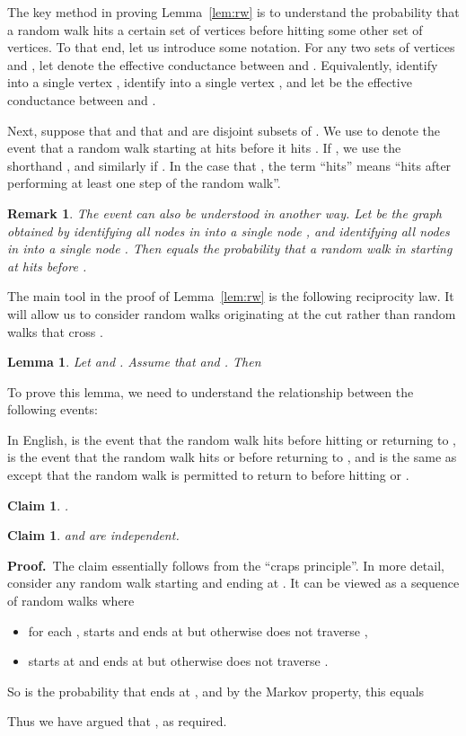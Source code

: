 \documentclass[11pt]{article}
\newcommand{\proofbelow}{8pt}
\numberwithin{equation}{section}
\newtheorem{lemma}[theorem]{Lemma}
\newtheorem*{remark}{Remark}
\newtheorem{claim}[theorem]{Claim}
\renewenvironment{proof}{\noindent\textbf{Proof.}\,}{\afterproof}
\newcommand{\afterproof}{\hfill  \par \vspace{\proofbelow}}
\newcommand{\ClaimName}[1]{\label{clm:#1}}
\newcommand{\LemmaName}[1]{\label{lem:#1}}
\newcommand{\Lemma}[1]{Lemma~\ref{lem:#1}}
\begin{document}
The key method in proving \Lemma{rw} is to understand the probability
that a random walk hits a certain set of vertices before hitting some other set of vertices.
To that end, let us introduce some notation.
For any two sets of vertices  and , 
let  denote the effective conductance between  and .
Equivalently, identify  into a single vertex , identify  into a single vertex ,
and let  be the effective conductance between  and .

Next, suppose that  and that  and  are disjoint subsets of .
We use  to denote the event that 
a random walk starting at  hits  before it hits .
If , we use the shorthand ,
and similarly if .
In the case that , the term ``hits'' means
``hits after performing at least one step of the random walk''.

\begin{remark}
The event  can also be understood in another way.
Let  be the graph obtained by identifying all nodes in  into a single node ,
and identifying all nodes in  into a single node .
Then  equals the probability that a random walk in 
starting at  hits  before .
\end{remark}

The main tool in the proof of \Lemma{rw} is the following reciprocity law.
It will allow us to consider random walks originating at the cut  rather
than random walks that cross .

\begin{lemma}
\LemmaName{switch}
Let  and .
Assume that  and .
Then

\end{lemma}

To prove this lemma, we need to understand the relationship between the following events:

In English,  is the event
that the random walk hits  before hitting  or returning to ,
 is the event that the random walk hits  or  before returning to ,
and  is the same as  except that
the random walk is permitted to return to  before hitting  or .

\begin{claim}
\ClaimName{split_xi}
.
\end{claim}

\begin{claim}
\ClaimName{indep_xi}
 and  are independent.
\end{claim}
\begin{proof}
The claim essentially follows from the ``craps principle''.
In more detail, consider any random walk starting  and ending at .
It can be viewed as a sequence  of random walks where
\begin{itemize}
\item for each ,  starts and ends at  but otherwise does not traverse ,
\item  starts at  and ends at  but otherwise does not traverse .
\end{itemize}
So  is the probability that  ends at ,
and by the Markov property, this equals

Thus we have argued that , as required.
\end{proof}
\end{document}
